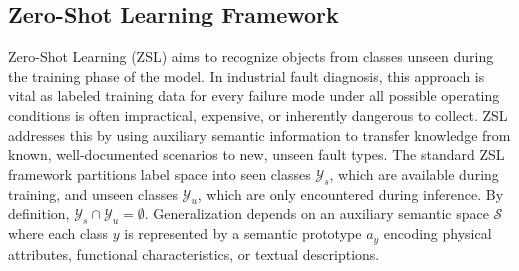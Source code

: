 \subsection{Zero-Shot Learning Framework}
Zero-Shot Learning (ZSL) aims to recognize objects from classes unseen during the training phase of the model. In industrial fault diagnosis, this approach is vital as labeled training data for every failure mode under all possible operating conditions is often impractical, expensive, or inherently dangerous to collect. ZSL addresses this by using auxiliary semantic information to transfer knowledge from known, well-documented scenarios to new, unseen fault types. The standard ZSL framework partitions label space into seen classes $\mathcal{Y}_s$, which are available during training, and unseen classes $\mathcal{Y}_u$, which are only encountered during inference. By definition, $\mathcal{Y}_s \cap \mathcal{Y}_u = \emptyset$. Generalization depends on an auxiliary semantic space $\mathcal{S}$ where each class $y$ is represented by a semantic prototype $a_y$ encoding physical attributes, functional characteristics, or textual descriptions.

